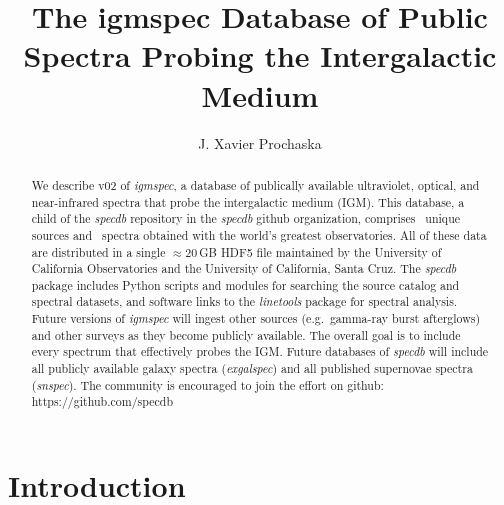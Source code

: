 \documentclass[12pt]{elsarticle}
\begin{document}
\begin{frontmatter}

\title{The igmspec Database of Public Spectra Probing
the Intergalactic Medium}


\author{
J. Xavier Prochaska}%
\address{
Department of Astronomy and Astrophysics, UCO/Lick Observatory, University of California, 1156 High Street, Santa Cruz, CA 95064}

\begin{abstract}
We describe v02 of {\it igmspec}, a database of publically
available ultraviolet, optical, and near-infrared spectra 
that probe the intergalactic medium (IGM).  This database, a child
of the {\it specdb} repository in the {\it specdb} github organization, 
comprises \nsource~unique
sources and \nspectra~spectra obtained with the world's greatest
observatories.  All of these data are distributed in a single
$\approx 20$\,GB HDF5 file maintained by the University of
California Observatories and the University of California,
Santa Cruz.  The {\it specdb} package includes
Python scripts and modules for searching the source catalog
and spectral datasets, and software links to the {\it linetools}
package for spectral analysis.
Future versions of {\it igmspec} will ingest other sources
(e.g.\ gamma-ray burst afterglows) and other surveys as they become
publicly available.  
The overall goal is to include every 
spectrum that effectively probes the IGM.  
Future databases of {\it specdb}
will include 
all publicly available galaxy spectra 
({\it exgalspec}) and 
all published supernovae spectra ({\it snspec}). 
The community is encouraged to join the effort on github:
https://github.com/specdb
\end{abstract}

\end{frontmatter}


\section{Introduction}
\label{sec:intro}
\end{document}
